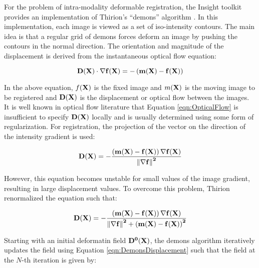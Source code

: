 %
%
%
%
%
%

For the problem of intra-modality deformable registration, the Insight
toolkit provides an implementation of Thirion's ``demons'' algorithm
\cite{Thirion1995b,Thirion1998}. 
In this implementation, each image is viewed as a set of iso-intensity contours. 
The main idea is that a regular grid of demons forces deform an image by 
pushing the contours in the normal direction. 
The orientation and magnitude of the displacement is 
derived from the instantaneous optical flow equation:

\begin{equation}
\bf{D}(\bf{X}) \cdot \nabla f(\bf{X}) = - \left(m(\bf{X}) - f(\bf{X}) \right)
\label{eqn:OpticalFlow}
\end{equation}

In the above equation, $f(\bf{X})$ is the fixed image and $m(\bf{X})$
is the moving image to be registered and $\bf{D}(\bf{X})$ is the displacement 
or optical flow between the images. It is well known in optical flow
literature that Equation \ref{eqn:OpticalFlow} is insufficient to specify 
$\bf{D}(\bf{X})$ locally and is usually determined using some form of
regularization. For registration, the projection of the vector on the
direction of the intensity gradient is used:

\begin{equation}
\bf{D}(\bf{X}) = - \frac
{\left(  m(\bf{X}) - f(\bf{X}) \right) \nabla f(\bf{X})}
{\left\|  \nabla f \right\|^2 } 
\end{equation}

However, this equation becomes unstable for small values of the image gradient,
resulting in large displacement values. To overcome this problem, Thirion
renormalized the equation such that:

\begin{equation}
\bf{D}(\bf{X}) = - \frac
{\left(  m(\bf{X}) - f(\bf{X}) \right) \nabla f(\bf{X})}
{\left\|  \nabla f \right\|^2 + \left(  m(\bf{X}) - f(\bf{X}) \right)^2 } 
\label{eqn:DemonsDisplacement}
\end{equation}

Starting with an initial deformatin field $\bf{D}^{0}(\bf{X})$, the demons algorithm
iteratively updates the field using Equation \ref{eqn:DemonsDisplacement} such
that the field at the $N$-th iteration is given by:

